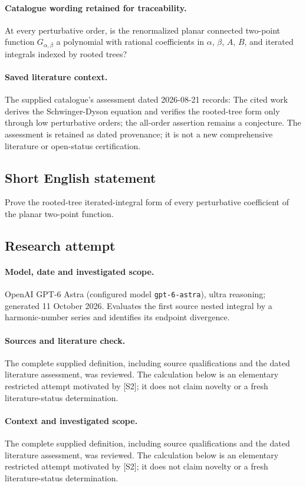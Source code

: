 \documentclass[11pt]{article}
\begin{document}
\paragraph{Catalogue wording retained for traceability.}
At every perturbative order, is the renormalized planar connected two-point function $G_{\alpha,\beta}$ a polynomial with rational coefficients in $\alpha$, $\beta$, $A$, $B$, and iterated integrals indexed by rooted trees?

\paragraph{Saved literature context.} The supplied catalogue's assessment dated 2026-08-21 records: The cited work derives the Schwinger-Dyson equation and verifies the rooted-tree form only through low perturbative orders; the all-order assertion remains a conjecture. The assessment is retained as dated provenance; it is not a new comprehensive literature or open-status certification.
\subsection{Short English statement}
Prove the rooted-tree iterated-integral form of every perturbative coefficient of the planar two-point function.
\subsection{Research attempt}
\paragraph{Model, date and investigated scope.}
OpenAI GPT-6 Astra (configured model \texttt{gpt-6-astra}), ultra reasoning; generated 11 October 2026. Evaluates the first source nested integral by a harmonic-number series and identifies its endpoint divergence.

\paragraph{Sources and literature check.}
The complete supplied definition, including source qualifications and the dated literature assessment, was reviewed. The calculation below is an elementary restricted attempt motivated by [S2]; it does not claim novelty or a fresh literature-status determination.

\paragraph{Context and investigated scope.} The complete supplied definition, including source qualifications and the dated literature assessment, was reviewed. The calculation below is an elementary restricted attempt motivated by [S2]; it does not claim novelty or a fresh literature-status determination.
\end{document}
